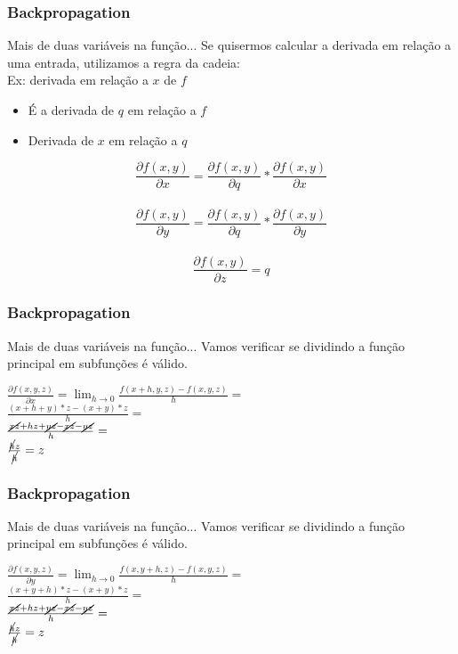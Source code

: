 \documentclass{beamer}
\begin{document}
\begin{frame}
	\frametitle{Backpropagation}
	\begin{block}{Mais de duas variáveis na função...}
		Se quisermos calcular a derivada em relação a uma entrada, utilizamos a regra da cadeia: \\
		Ex: derivada em relação a $x$ de $f$
		\begin{itemize}
			\item É a derivada de $q$ em relação a $f$ 
			\item Derivada de $x$ em relação a $q$
		\end{itemize}
	\end{block}
	\begin{example}
				$$\frac{\partial f(x,y)}{\partial x} = \frac{\partial f(x,y)}{\partial q} * \frac{\partial f(x,y)}{\partial x}$$ \\
				$$\frac{\partial f(x,y)}{\partial y} = \frac{\partial f(x,y)}{\partial q} * \frac{\partial f(x,y)}{\partial y}$$ \\
				$$\frac{\partial f(x,y)}{\partial z} = q$$ 
	\end{example}
\end{frame}
\begin{frame}
	\frametitle{Backpropagation}
	\begin{block}{Mais de duas variáveis na função...}
		Vamos verificar se dividindo a função principal em subfunções é válido.
	\end{block}
	\begin{example}
		\renewcommand{\CancelColor}{\color{red}}
		$\frac{\partial f(x,y, z)}{\partial x} = \lim_{h \rightarrow 0 }\frac{f(x+h, y,z) - f(x,y,z)}{h} = $ \\ 
		
		$ \frac{(x+h + y)*z - (x + y)*z}{h} = $ \\ $\frac{\cancel{xz}+hz + \cancel{yz} - \cancel{xz} - \cancel{yz}}{h} = $ \\ $\frac{\cancel{h}z}{\cancel{h}} = z $
	\end{example}
\end{frame}
\begin{frame}
	\frametitle{Backpropagation}
	\begin{block}{Mais de duas variáveis na função...}
		Vamos verificar se dividindo a função principal em subfunções é válido.
	\end{block}
	\begin{example}
		\renewcommand{\CancelColor}{\color{red}}
		$\frac{\partial f(x,y, z)}{\partial y} = \lim_{h \rightarrow 0 }\frac{f(x, y+h,z) - f(x,y,z)}{h} = $ \\ 
		
		$ \frac{(x + y + h)*z - (x + y)*z}{h} = $ \\ $\frac{\cancel{xz}+hz + \cancel{yz} - \cancel{xz} - \cancel{yz}}{h} = $ \\ $\frac{\cancel{h}z}{\cancel{h}} = z $
	\end{example}
\end{frame}
\end{document}
